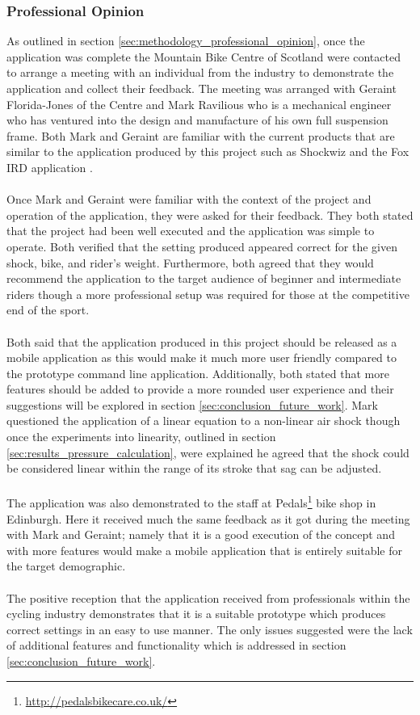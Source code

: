 		\subsubsection{Professional Opinion}
			As outlined in section \ref{sec:methodology_professional_opinion}, once the application was complete the Mountain Bike Centre of Scotland were contacted to arrange a meeting with an individual from the industry to demonstrate the application and collect their feedback. The meeting was arranged with Geraint Florida-Jones of the Centre and Mark Ravilious who is a mechanical engineer who has ventured into the design and manufacture of his own full suspension frame. Both Mark and Geraint are familiar with the current products that are similar to the application produced by this project such as Shockwiz \citep{quarq2017shockwiz} and the Fox IRD application \citep{foxird}.
			\\\\
			Once Mark and Geraint were familiar with the context of the project and operation of the application, they were asked for their feedback. They both stated that the project had been well executed and the application was simple to operate. Both verified that the setting produced appeared correct for the given shock, bike, and rider’s weight. Furthermore, both agreed that they would recommend the application to the target audience of beginner and intermediate riders though a more professional setup was required for those at the competitive end of the sport.
			\\\\
			Both said that the application produced in this project should be released as a mobile application as this would make it much more user friendly compared to the prototype command line application. Additionally, both stated that more features should be added to provide a more rounded user experience and their suggestions will be explored in section \ref{sec:conclusion_future_work}. Mark questioned the application of a linear equation to a non-linear air shock though once the experiments into linearity, outlined in section \ref{sec:results_pressure_calculation}, were explained he agreed that the shock could be considered linear within the range of its stroke that sag can be adjusted.
			\\\\
			The application was also demonstrated to the staff at Pedals\footnote{\url{http://pedalsbikecare.co.uk/}} bike shop in Edinburgh. Here it received much the same feedback as it got during the meeting with Mark and Geraint; namely that it is a good execution of the concept and with more features would make a mobile application that is entirely suitable for the target demographic. 
			\\\\
			The positive reception that the application received from professionals within the cycling industry demonstrates that it is a suitable prototype which produces correct settings in an easy to use manner. The only issues suggested were the lack of additional features and functionality which is addressed in section \ref{sec:conclusion_future_work}.